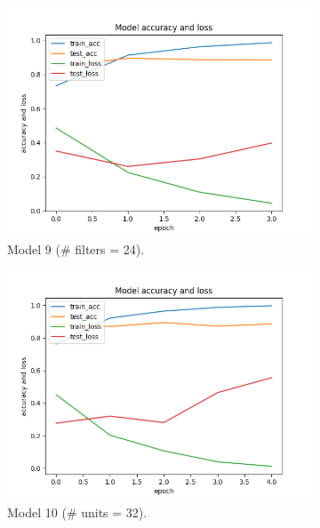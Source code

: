 \documentclass[11pt]{article}
\begin{document}
\begin{figure}[h!]
\centering
%
\begin{subfigure}{0.32\textwidth}
         \centering
         \includegraphics[width=\textwidth]{model9.png}
         \caption{Model 9 (\# filters = 24).}
         \label{fig:model9}
\end{subfigure}
\hfill
\begin{subfigure}{0.32\textwidth}
         \centering
         \includegraphics[width=\textwidth]{model10.png}
         \caption{Model 10 (\# units = 32).}
         \label{fig:model10}
\end{subfigure}
\hfill
\begin{subfigure}{0.32\textwidth}

\end{subfigure}
\end{figure}
\end{document}
